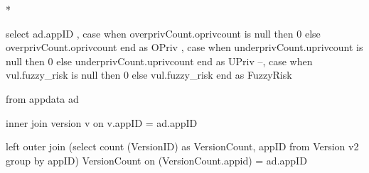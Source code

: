 \documentclass{sig-alternate}
\begin{document}


%


%		






\/*


select ad.appID
, case when overprivCount.oprivcount is null then 0 else overprivCount.oprivcount end as OPriv
, case when underprivCount.uprivcount is null then 0 else underprivCount.uprivcount end as UPriv
--, case when vul.fuzzy_risk is null then 0 else vul.fuzzy_risk end as FuzzyRisk


from appdata ad

inner join version v on v.appID = ad.appID

left outer join (select count (VersionID) as VersionCount, appID from Version v2 group by appID) VersionCount on (VersionCount.appid) = ad.appID
\end{document}

